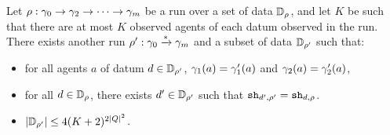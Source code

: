 \documentclass[a4paper,UKenglish,cleveref, autoref, thm-restate]{lipics-v2021}
\begin{document}
	\begin{lemma}
		\label{lem:bound-observed-data}
		Let $\rho : \gamma_0 \to \gamma_2 \to \cdots \to \gamma_m$ be a run  over a set of data $\mathbb{D}_{\rho}$, and let $K$ be such that there are at most $K$ observed agents of each datum observed in the run. There exists another run $\rho' : \gamma_0 \xrightarrow{*} \gamma_m$ and a subset of data $\mathbb{D}_{\rho'}$ such that:
		\begin{itemize}
				\item for all agents $a$ of datum $d \in \mathbb{D}_{\rho'}$, $\gamma_1(a) = \gamma'_1(a)$ and $\gamma_2(a) = \gamma'_2(a)$,
				
				\item for all $d \in \mathbb{D}_{\rho}$, there exists $d' \in \mathbb{D}_{\rho'}$ such that $\mathtt{sh}_{d',\rho'} = \mathtt{sh}_{d,\rho}$.
				
				\item $|\mathbb{D}_{\rho'}| \leq 4(K+2)^{2|Q|^2}$.
		\end{itemize}
	\end{lemma}
	 
\end{document}
